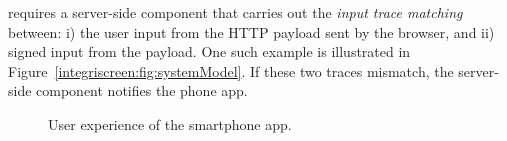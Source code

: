 \sysname requires a server-side component that carries out the \emph{input trace matching} between: i) the user input from the HTTP payload sent by the browser, and ii) signed input from the \sysname \tls payload. One such example is illustrated in Figure~\ref{integriscreen:fig:systemModel}. If these two traces mismatch, the \name server-side component notifies the \name phone app.



\begin{figure}[t]
	\captionsetup[subfigure]{justification=centering}
	\centering
	\null
	\hfill
	\hfill
	\hfill
	\null
	\caption{
		User experience of the smartphone app.
}
	\label{fig:userExperience}
\end{figure}




